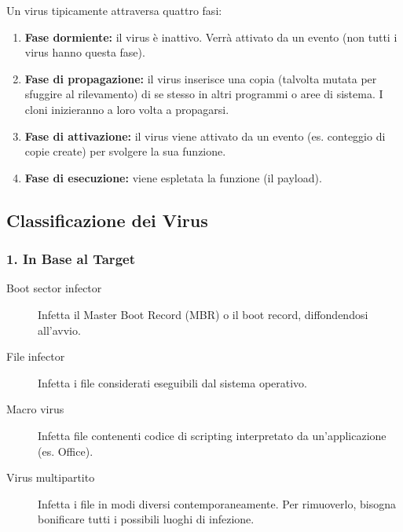 Un virus tipicamente attraversa quattro fasi:
\begin{enumerate}
    \item \textbf{Fase dormiente:} il virus è inattivo. Verrà attivato da un evento (non tutti i virus hanno questa fase).
    \item \textbf{Fase di propagazione:} il virus inserisce una copia (talvolta mutata per sfuggire al rilevamento) di se stesso in altri programmi o aree di sistema. I cloni inizieranno a loro volta a propagarsi.
    \item \textbf{Fase di attivazione:} il virus viene attivato da un evento (es. conteggio di copie create) per svolgere la sua funzione.
    \item \textbf{Fase di esecuzione:} viene espletata la funzione (il payload).
\end{enumerate}

\subsection{Classificazione dei Virus}
\subsubsection{1. In Base al Target}
\begin{description}
    \item[Boot sector infector] Infetta il Master Boot Record (MBR) o il boot record, diffondendosi all'avvio.
    \item[File infector] Infetta i file considerati eseguibili dal sistema operativo.
    \item[Macro virus] Infetta file contenenti codice di scripting interpretato da un'applicazione (es. Office).
    \item[Virus multipartito] Infetta i file in modi diversi contemporaneamente. Per rimuoverlo, bisogna bonificare tutti i possibili luoghi di infezione.
\end{description}

